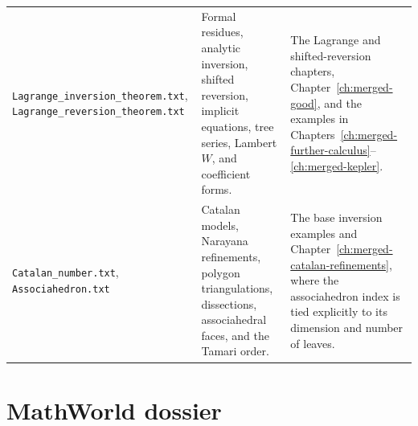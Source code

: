 \documentclass[11pt,a4paper,oneside,openany]{book}
\theoremstyle{definition}
\theoremstyle{remark}
\begin{document}
\begin{longtable}{>{\raggedright\arraybackslash}p{}
                  >{\raggedright\arraybackslash}p{}
                  >{\raggedright\arraybackslash}p{}}
\nolinkurl{Lagrange_inversion_theorem.txt},
\nolinkurl{Lagrange_reversion_theorem.txt}
& Formal residues, analytic inversion, shifted reversion, implicit equations,
  tree series, Lambert $W$, and coefficient forms.
& The Lagrange and shifted-reversion chapters,
  Chapter~\ref{ch:merged-good}, and the examples in
  Chapters~\ref{ch:merged-further-calculus}--\ref{ch:merged-kepler}.\\[1ex]

\nolinkurl{Catalan_number.txt}, \nolinkurl{Associahedron.txt}
& Catalan models, Narayana refinements, polygon triangulations, dissections,
  associahedral faces, and the Tamari order.
& The base inversion examples and Chapter~\ref{ch:merged-catalan-refinements},
  where the associahedron index is tied explicitly to its dimension and number of
  leaves.\\
\end{longtable}
\renewcommand{\arraystretch}{1}

\section{MathWorld dossier}
\end{document}
